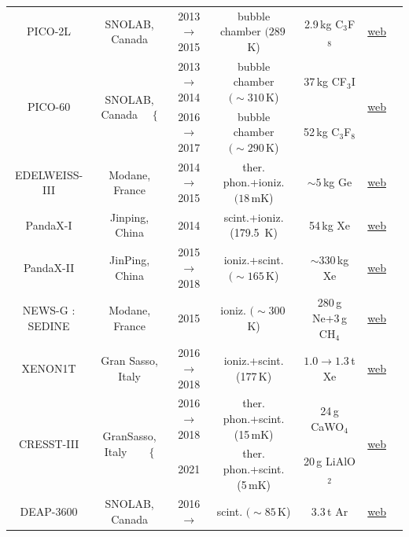 \begin{table}[p]
\begin{center}
{\begin{tabular}{ccccccc}
 {\sc PICO-2L} & SNOLAB, Canada & 2013 $\to$ 2015 &    bubble chamber $(289\,$K) & 2.9\,kg C${}_3$F${}_8$ & \href{http://www.picoexperiment.com}{web} & \cite{PICO-2L}
 \\

\multirow{2}{*}{{\sc PICO-60}} & \multirow{2}{*}{SNOLAB, Canada ~~$\Big\{$} & 2013 $\to$ 2014 &    bubble chamber $(\sim310\,$K) & 37\,kg CF${}_3$I & \multirow{2}{*}{\href{http://www.picoexperiment.com}{web}} & \multirow{2}{*}{\cite{PICO-60}}
\\

 & & 2016 $\to$ 2017 &   bubble chamber $(\sim290\,$K) & 52\,kg  C${}_3$F${}_8$ &  & 
\\

{\sc EDELWEISS-III} & Modane, France & 2014 $\to$ 2015 &  ther. phon.+ioniz.$(18\,$mK) & $\sim5\,$kg Ge & \href{http://edelweiss.in2p3.fr}{web} & \cite{EDELWEISS-III}
\\

{\sc PandaX-I} & Jinping, China & 2014 &  scint.+ioniz. (179.5 \,K)  &  54\,kg Xe & \href{https://pandax.sjtu.edu.cn}{web} & \cite{PandaX-I}
\\

{\sc PandaX-II} & JinPing, China & 2015 $\to$ 2018 &  ioniz.+scint. $(\sim165\,$K) & $\sim 330\,$kg Xe &  \href{https://pandax.sjtu.edu.cn}{web} & \cite{PandaX-II}
\\

{\sc NEWS-G : SEDINE} & Modane, France & 2015 &  ioniz. $(\sim300\,$K) & 280\,g Ne+3\,g CH${}_4$ &  \href{https://www.queensu.ca/physics/news-g//}{web} & \cite{NEWS-G} \\

{\sc XENON1T} & Gran Sasso, Italy & 2016 $\to$ 2018 & ioniz.+scint. (177\,K) & $1.0\to1.3$\,t Xe & \href{https://xenonexperiment.org}{web} & \cite{Xenon-1T} 
\\

 
\multirow{2}{*}{{\sc CRESST-III}} & \multirow{2}{*}{GranSasso, Italy~~~~$\Big\{$} & 2016 $\to$ 2018 &  ther. phon.+scint. (15\,mK) & 24\,g CaWO${}_4$ & \multirow{2}{*}{\href{https://www.cresst.de}{web}} & \multirow{2}{*}{\cite{CRESST-III}}
\\

 &  & 2021 &  ther. phon.+scint. (5\,mK)& 20\,g LiAlO${}_2$ &  & 
\\

{\sc DEAP-3600} & SNOLAB, Canada & 2016 $\to$ & scint. $(\sim85\,$K)  & 3.3\,t Ar & \href{http://deap3600.ca}{web} & \cite{DEAP-3600}
\\


\end{tabular}}
\end{center}
\end{table}

